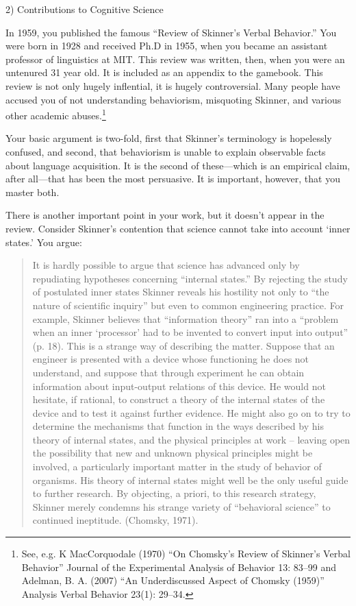 \begin{refsection}
2) Contributions to Cognitive Science

In 1959, you published the famous ``Review of Skinner's Verbal Behavior.'' You were born in 1928 and received Ph.D in 1955, when you became an assistant professor of linguistics at MIT. This review was written, then, when you were an untenured 31 year old. It is included as an appendix to the gamebook. This review is not only hugely inflential, it is hugely controversial. Many people have accused you of not understanding behaviorism, misquoting Skinner, and various other academic abuses.\footnote{See, e.g. K MacCorquodale (1970) ``On Chomsky's Review of Skinner's Verbal Behavior'' Journal of the Experimental Analysis of Behavior 13: 83--99 and Adelman, B. A. (2007) ``An Underdiscussed Aspect of Chomsky (1959)'' Analysis Verbal Behavior 23(1): 29--34.}

Your basic argument is two-fold, first that Skinner's terminology is hopelessly confused, and second, that behaviorism is unable to explain observable facts about language acquisition. It is the second of these---which is an empirical claim, after all---that has been the most persuasive. It is important, however, that you master both.

There is another important point in your work, but it doesn't appear in the review. Consider Skinner's contention that science cannot take into account `inner states.' You argue:

\begin{quote}

It is hardly possible to argue that science has advanced only by repudiating hypotheses concerning ``internal states.'' By rejecting the study of postulated inner states Skinner reveals his hostility not only to ``the nature of scientific inquiry'' but even to common engineering practice. For example, Skinner believes that ``information theory'' ran into a ``problem when an inner `processor' had to be invented to convert input into output'' (p. 18).
This is a strange way of describing the matter. Suppose that an engineer is presented with a device whose functioning he does not understand, and suppose that through experiment he can obtain information about input-output relations of this device. He would not hesitate, if rational, to construct a theory of the internal states of the device and to test it against further evidence. He might also go on to try to determine the mechanisms that function in the ways described by his theory of internal states, and the physical principles at work -- leaving open the possibility that new and unknown physical principles might be involved, a particularly important matter in the study of behavior of organisms. His theory of internal states might well be the only useful guide to further research. By objecting, a priori, to this research strategy, Skinner merely condemns his strange variety of ``behavioral science'' to continued ineptitude. (Chomsky, 1971).
\end{quote}


\end{refsection}
